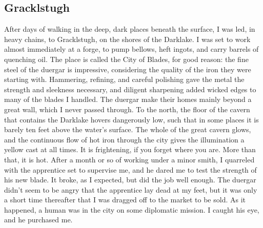 \documentclass[10pt,a4paper,twoside,twocolumn,openany,bg=print,nodeprecatedcode]{dndbook}
\begin{document}
\subsection{Gracklstugh}
After days of walking in the deep, dark places beneath the surface, I was led, in heavy chains, to Gracklstugh, on the shores of the Darklake. I was set to work almost immediately at a forge, to pump bellows, heft ingots, and carry barrels of quenching oil. The place is called the City of Blades, for good reason: the fine steel of the duergar is impressive, considering the quality of the iron they were starting with. Hammering, refining, and careful polishing gave the metal the strength and sleekness necessary, and diligent sharpening added wicked edges to many of the blades I handled.
The duergar make their homes mainly beyond a great wall, which I never passed through. To the north, the floor of the cavern that contains the Darklake hovers dangerously low, such that in some places it is barely ten feet above the water's surface. The whole of the great cavern glows, and the continuous flow of hot iron through the city gives the illumination a yellow cast at all times. It is frightening, if you forget where you are. More than that, it is hot.
After a month or so of working under a minor smith, I quarreled with the apprentice set to supervise me, and he dared me to test the strength of his new blade. It broke, as I expected, but did the job well enough. The duergar didn't seem to be angry that the apprentice lay dead at my feet, but it was only a short time thereafter that I was dragged off to the market to be sold. As it happened, a human was in the city on some diplomatic mission. I caught his eye, and he purchased me.
\end{document}
